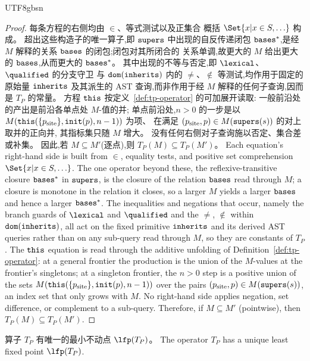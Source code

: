 \begin{CJK*}{UTF8}{gbsn}
\begin{proof}
\ifPaperChinese
  每条方程的右侧均由 $\in$、等式测试以及正集合
  概括 $\Set{ x | x \in S, \ldots }$ 构成。
  超出这些构造子的唯一算子,即 $\mathtt{supers}$ 中出现的自反传递闭包
  $\mathtt{bases}^*$,是经 $M$ 解释的关系 $\mathtt{bases}$ 的闭包;闭包对其所闭合的
  关系单调,故更大的 $M$ 给出更大的 $\mathtt{bases}$,从而更大的 $\mathtt{bases}^*$。
  其中出现的不等与否定,即 $\lexical$、$\qualified$ 的分支守卫
  与 $\mathtt{dom}(\mathtt{inherits})$ 内的 $\neq$、$\notin$ 等测试,均作用于固定的原始量 $\mathtt{inherits}$
  及其派生的 AST 查询,而非作用于经 $M$ 解释的任何子查询,因而是 $T_P$ 的常量。
  方程 $\mathtt{this}$ 按定义~\ref{def:tp-operator} 的可加展开读取:
  一般前沿处的产出是前沿各单点处 $M$-值的并;
  单点前沿处,$n > 0$ 的一步是以
  $M(\mathtt{this}(\{p_{\mathrm{site}}\}, \mathtt{init}(p), n-1))$ 为项、
  在满足 $(p_{\mathrm{site}}, p) \in M(\mathtt{supers}(s))$ 的对上取并的正向并,
  其指标集只随 $M$ 增大。
  没有任何右侧对子查询施以否定、集合差或补集。
  因此,若 $M \subseteq M'$(逐点),则 $T_P(M) \subseteq T_P(M')$。
\else
  Each equation's right-hand side is built from
  $\in$, equality tests, and positive set
  comprehension $\Set{ x | x \in S, \ldots }$.
  The one operator beyond these, the reflexive-transitive
  closure $\mathtt{bases}^*$ in $\mathtt{supers}$, is the closure of the
  relation $\mathtt{bases}$ read through $M$; a closure is monotone in
  the relation it closes, so a larger $M$ yields a larger
  $\mathtt{bases}$ and hence a larger $\mathtt{bases}^*$.
  The inequalities and negations that occur, namely
  the branch guards of $\lexical$ and $\qualified$
  and the $\neq$, $\notin$ within $\mathtt{dom}(\mathtt{inherits})$, all act on the
  fixed primitive $\mathtt{inherits}$ and its derived AST queries rather than
  on any sub-query read through $M$, so they are constants of $T_P$.
  The $\mathtt{this}$ equation is read through the additive unfolding of
  Definition~\ref{def:tp-operator}: at a general frontier the
  production is the union of the $M$-values at the frontier's
  singletons; at a singleton frontier, the $n > 0$ step is a positive
  union of the sets
  $M(\mathtt{this}(\{p_{\mathrm{site}}\}, \mathtt{init}(p), n-1))$ over the
  pairs $(p_{\mathrm{site}}, p) \in M(\mathtt{supers}(s))$, an index set
  that only grows with $M$.
  No right-hand side applies negation, set difference, or
  complement to a sub-query.
  Therefore, if $M \subseteq M'$ (pointwise), then
  $T_P(M) \subseteq T_P(M')$.
\fi
\end{proof}

\begin{theorem}\label{thm:lfp-exists}
  \ifPaperChinese
  算子 $T_P$ 有唯一的最小不动点 $\lfp(T_P)$。
  \else
  The operator $T_P$ has a unique least fixed point
  $\lfp(T_P)$.
  \fi
\end{theorem}


\end{CJK*}
